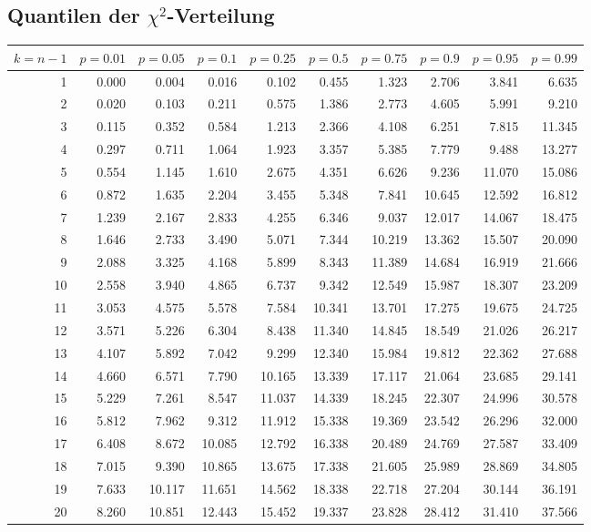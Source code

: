 	\subsection{Quantilen der $\chi^2$-Verteilung}
	\begin{minipage}{18cm}
    \scriptsize
\begin{center}
\begin{tabular}{|r|rrr|rrr|rrr|}
\hline
\strut$k = n-1$&$p=0.01$&$p=0.05$&$p=0.1$&$p=0.25$&$p=0.5$&$p=0.75$&$p=0.9$&$p=0.95$&$p=0.99$\\
\hline
1&0.000&0.004&0.016&0.102&0.455&1.323&2.706&3.841&6.635\\
2&0.020&0.103&0.211&0.575&1.386&2.773&4.605&5.991&9.210\\
3&0.115&0.352&0.584&1.213&2.366&4.108&6.251&7.815&11.345\\
4&0.297&0.711&1.064&1.923&3.357&5.385&7.779&9.488&13.277\\
5&0.554&1.145&1.610&2.675&4.351&6.626&9.236&11.070&15.086\\
6&0.872&1.635&2.204&3.455&5.348&7.841&10.645&12.592&16.812\\
7&1.239&2.167&2.833&4.255&6.346&9.037&12.017&14.067&18.475\\
8&1.646&2.733&3.490&5.071&7.344&10.219&13.362&15.507&20.090\\
9&2.088&3.325&4.168&5.899&8.343&11.389&14.684&16.919&21.666\\
10&2.558&3.940&4.865&6.737&9.342&12.549&15.987&18.307&23.209\\
11&3.053&4.575&5.578&7.584&10.341&13.701&17.275&19.675&24.725\\
12&3.571&5.226&6.304&8.438&11.340&14.845&18.549&21.026&26.217\\
13&4.107&5.892&7.042&9.299&12.340&15.984&19.812&22.362&27.688\\
14&4.660&6.571&7.790&10.165&13.339&17.117&21.064&23.685&29.141\\
15&5.229&7.261&8.547&11.037&14.339&18.245&22.307&24.996&30.578\\
16&5.812&7.962&9.312&11.912&15.338&19.369&23.542&26.296&32.000\\
17&6.408&8.672&10.085&12.792&16.338&20.489&24.769&27.587&33.409\\
18&7.015&9.390&10.865&13.675&17.338&21.605&25.989&28.869&34.805\\
19&7.633&10.117&11.651&14.562&18.338&22.718&27.204&30.144&36.191\\
20&8.260&10.851&12.443&15.452&19.337&23.828&28.412&31.410&37.566\\

\end{tabular}
\end{center}
\end{minipage}
